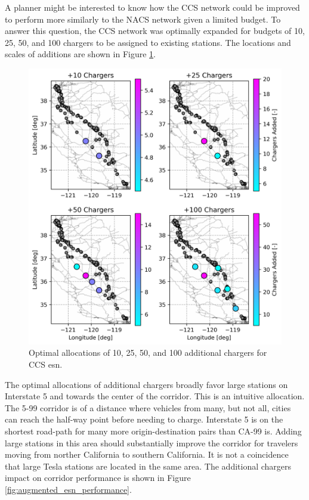 A planner might be interested to know how the CCS network could be improved to perform more similarly to the NACS network given a limited budget. To answer this question, the CCS network was optimally expanded for budgets of 10, 25, 50, and 100 chargers to be assigned to existing stations. The locations and scales of additions are shown in Figure \ref{fig:augmented_esns}.

\begin{figure}[H]
	\centering
	\includegraphics[width = \figurewidth]{./figures/augmented_esns.png}
	\caption{Optimal allocations of 10, 25, 50, and 100 additional chargers for CCS \gls{esn}.}
	\label{fig:augmented_esns}
\end{figure}

The optimal allocations of additional chargers broadly favor large stations on Interstate 5 and towards the center of the corridor. This is an intuitive allocation. The 5-99 corridor is of a distance where vehicles from many, but not all, cities can reach the half-way point before needing to charge. Interstate 5 is on the shortest road-path for many more origin-destination pairs than CA-99 is. Adding large stations in this area should substantially improve the corridor for travelers moving from norther California to southern California. It is not a coincidence that large Tesla stations are located in the same area. The additional chargers impact on corridor performance is shown in Figure \ref{fig:augmented_esn_performance}.

